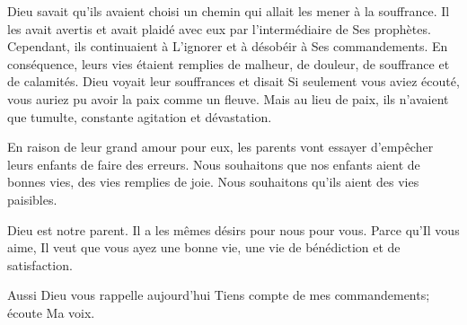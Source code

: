 Dieu savait qu'ils avaient choisi un chemin
 qui allait les mener à la souffrance.
 Il les avait avertis et avait plaidé avec eux
 par l'intermédiaire de Ses prophètes.
 Cependant, ils continuaient à L'ignorer et à désobéir
 à Ses commandements. En conséquence,
 leurs vies étaient remplies de malheur, de douleur,
 de souffrance et de calamités.
 Dieu voyait leur souffrances et disait\frcolon{} 
 \Og Si seulement vous aviez écouté, vous auriez pu avoir la paix
 comme un fleuve. \Fg{} 
 Mais au lieu de paix, ils n'avaient que tumulte,
 constante agitation et dévastation. 


En raison de leur grand amour pour eux,
 les parents vont essayer d'empêcher leurs enfants de faire des erreurs.
 Nous souhaitons que nos enfants aient de bonnes vies,
 des vies remplies de joie.
 Nous souhaitons qu'ils 
 aient des vies paisibles. 

Dieu est notre parent. Il a les mêmes désirs pour nous \ocadr pour vous.
 Parce qu'Il vous aime, Il veut que vous ayez une bonne vie,
 une vie de bénédiction et de satisfaction. 

Aussi Dieu vous rappelle aujourd'hui\frcolon{} 
 \Og Tiens compte de mes commandements; écoute Ma voix. \Fg{}

\dvrule








